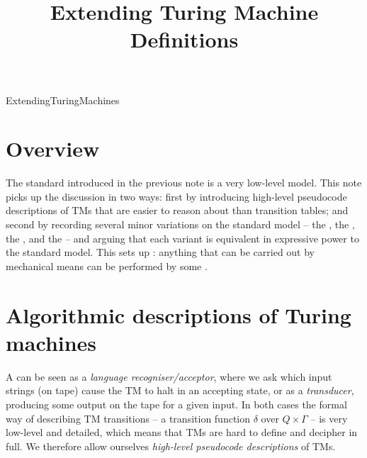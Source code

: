 \documentclass[hidelinks]{article}
\title{Extending Turing Machine Definitions}
\author{}
\date{}
\begin{document}
\maketitle

\begin{smodule}[title={Extending Turing Machine Definitions}]{ExtendingTuringMachines}


\section{Overview}

The standard  introduced in the previous note is a very low-level model. This note picks up the discussion in two ways: first by introducing high-level pseudocode descriptions of TMs that are easier to reason about than transition tables; and second by recording several minor variations on the standard model -- the , the , the , and the  -- and arguing that each variant is equivalent in expressive power to the standard model. This sets up : anything that can be carried out by mechanical means can be performed by some .

\section{Algorithmic descriptions of Turing machines}

A  can be seen as a \emph{language recogniser/acceptor}, where we ask which input strings (on tape) cause the TM to halt in an accepting state, or as a \emph{transducer}, producing some output on the tape for a given input. In both cases the formal way of describing TM transitions -- a transition function $\delta$ over $Q \times \Gamma$ -- is very low-level and detailed, which means that TMs are hard to define and decipher in full. We therefore allow ourselves \emph{high-level pseudocode descriptions} of TMs.


\end{smodule}
\end{document}
